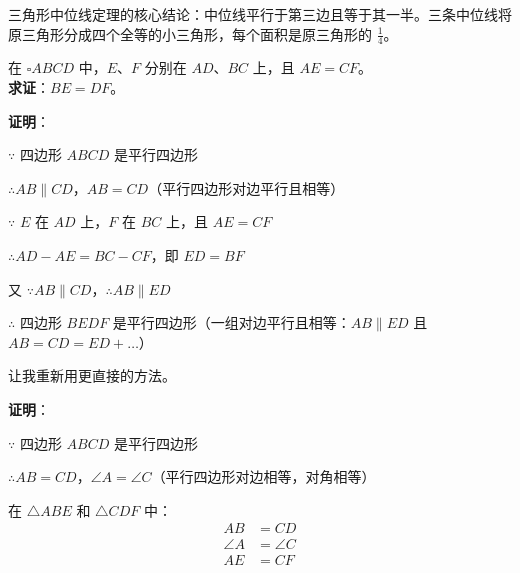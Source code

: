\documentclass[12pt, a4paper]{ctexart}
\begin{document}
\begin{tipbox}[方法总结]
三角形中位线定理的核心结论：中位线平行于第三边且等于其一半。三条中位线将原三角形分成四个全等的小三角形，每个面积是原三角形的 $\frac{1}{4}$。
\end{tipbox}

\vspace{6pt}

\begin{examplebox}
在 $\square ABCD$ 中，$E$、$F$ 分别在 $AD$、$BC$ 上，且 $AE = CF$。\\
\textbf{求证}：$BE = DF$。

\begin{center}
\end{center}
\end{examplebox}

\textbf{证明}：

$\because$ 四边形 $ABCD$ 是平行四边形

$\therefore AB \parallel CD$，$AB = CD$（平行四边形对边平行且相等）

$\because$ $E$ 在 $AD$ 上，$F$ 在 $BC$ 上，且 $AE = CF$

$\therefore AD - AE = BC - CF$，即 $ED = BF$

又 $\because AB \parallel CD$，$\therefore AB \parallel ED$

$\therefore$ 四边形 $BEDF$ 是平行四边形（一组对边平行且相等：$AB \parallel ED$ 且 $AB = CD = ED + \ldots$）

让我重新用更直接的方法。

\textbf{证明}：

$\because$ 四边形 $ABCD$ 是平行四边形

$\therefore AB = CD$，$\angle A = \angle C$（平行四边形对边相等，对角相等）

在 $\triangle ABE$ 和 $\triangle CDF$ 中：
\begin{align*}
AB &= CD\\
\angle A &= \angle C\\
AE &= CF
\end{align*}
\end{document}
